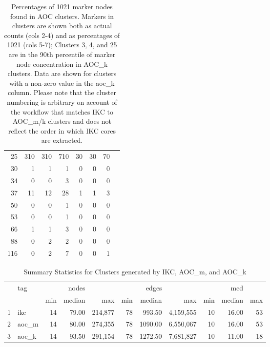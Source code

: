 \documentclass[12pt, oneside]{article}   	%
\begin{document}
\begin{table}[ht]
\begin{tabular}{rrrrrrrr}
25 & 310 & 310 & 710 &  30 &  30 &  70 \\ 
30 & 1 &   1 &   1 &   0 &   0 &   0 \\ 
34 & 0 &   0 &   3 &   0 &   0 &   0 \\ 
37 & 11 &  12 &  28 &   1 &   1 &   3 \\ 
50 & 0 &   0 &   1 &   0 &   0 &   0 \\ 
53 & 0 &   0 &   1 &   0 &   0 &   0 \\ 
66 & 1 &   1 &   3 &   0 &   0 &   0 \\ 
88 & 0 &   2 &   2 &   0 &   0 &   0 \\ 
116 & 0 &  2 &   7 &   0 &   0 &   1 \\ 
   \hline
\end{tabular}
\caption{Percentages of 1021 marker nodes found in AOC clusters. Markers in clusters are shown both as actual counts (cols 2-4) and as percentages of 1021 (cols 5-7); Clusters 3, 4, and 25 are in the 90th percentile of marker node concentration in AOC\_k clusters. Data are shown for clusters with a non-zero value in the aoc\_k column. Please note that the cluster numbering is arbitrary on account of the workflow that matches IKC to AOC\_m/k clusters and does not reflect the order in which IKC cores are extracted. }
\end{table}

\begin{table}[ht]
\centering
\begin{tabular}{rlrrrrrrrrr}
  \hline
 & tag &  & nodes &  & & edges & &  & mcd &  \\ 
  & & min & median & max & min & median & max & min & median & max   \\ 
  \hline
1 & ikc &  14 & 79.00 & 214,877 &  78 & 993.50 & 4,159,555 &  10 & 16.00 &  53 \\ 
  2 & aoc\_m &  14 & 80.00 & 274,355 &  78 & 1090.00 & 6,550,067 &  10 & 16.00 &  53 \\ 
  3 & aoc\_k &  14 & 93.50 & 291,154 &  78 & 1272.50 & 7,681,827 &  10 & 11.00 &  18 \\ 
   \hline
\end{tabular}
\caption{Summary Statistics for Clusters generated by IKC, AOC\_m, and AOC\_k}
\end{table}
\end{document}
